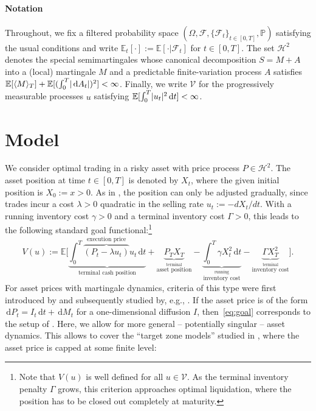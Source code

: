 \documentclass[11pt]{article}
\numberwithin{equation}{section}
\theoremstyle{definition}
\theoremstyle{remark}
\newcommand{\E}{\mathbb{E}} %
\renewcommand{\P}{\mathbb{P}} %
\newcommand{\F}{\mathcal{F}} %
\DeclarePairedDelimiter{\abs}{\lvert}{\rvert} %
\newcommand{\de}{\,\mathrm{d}}
\begin{document}
\paragraph{Notation}

Throughout, we fix a filtered probability space $(\Omega, \F, \{\F_t\}_{t\in[0,T]}, \P)$ satisfying the usual conditions and write $\E_t[\cdot] := \E[\cdot \vert \F_t]$ for $t\in[0,T]$. The set $\mathcal{H}^2$ denotes the special semimartingales whose canonical decomposition $S=M+A$ into a (local) martingale $M$ and a predictable finite-variation process $A$ satisfies $\E[\langle M\rangle_T] + \E[(\int_0^T \abs{\de A_t})^2] < \infty$. Finally, we write $\mathcal{V}$ for the progressively measurable processes $u$ satisfying $\E[\int_0^T \abs{u_t}^2 \de t] < \infty$.


\section{Model}\label{s:model}

We consider optimal trading in a risky asset with price process $P \in \mathcal{H}^2$. The asset position at time $t \in [0,T]$ is denoted by $X_t$, where the given initial position is $X_0:=x>0$. As in \cite{almgren2001optimal}, the position can only be adjusted gradually, since trades incur a cost $\lambda>0$ quadratic in the selling rate $u_t := -dX_t/dt$. With a running inventory cost $\gamma>0$ and a terminal inventory cost $\Gamma>0$, this leads to the following standard goal functional:\footnote{Note that $V(u)$ is well defined for all $u\in\mathcal V$. As the terminal inventory penalty $\Gamma$ grows, this criterion approaches optimal liquidation, where the position has to be closed out completely at maturity.}
\begin{equation}\label{eq:goal}
 V(u):= \E\Bigg[\underbrace{\int_0^T \overbrace{(P_t - \lambda u_t)}^{\textrm{execution price}} u_t \de t}_{\textrm{terminal cash position}} + \underbrace{P_T X_T}_{\stackrel{\textrm{terminal}}{\textrm{asset position}}} - \underbrace{\int_0^T \gamma X_t^2 \de t}_{\stackrel{\textrm{running}}{\textrm{inventory cost}}} - \underbrace{\Gamma X_T^2}_{\stackrel{\textrm{terminal}}{\textrm{inventory cost}}} \Bigg].
\end{equation}
For asset prices with martingale dynamics, criteria of this type were first introduced by \cite{almgren.12,forsyth.al.12} and subsequently studied by, e.g., \cite{schied.13,ankirchner.al.14,graewe.al.15}. If the asset price is of the form $\de P_t = I_t \de t + \de M_t$ for a one-dimensional diffusion $I$, then~\eqref{eq:goal} corresponds to the setup of \cite{lehalle2017incorporating}.  Here, we allow for more general -- potentially singular -- asset dynamics. This allows to cover the ``target zone models'' studied in \cite{neuman.schied.16}, where the asset price is capped at some finite level: 
\end{document}
